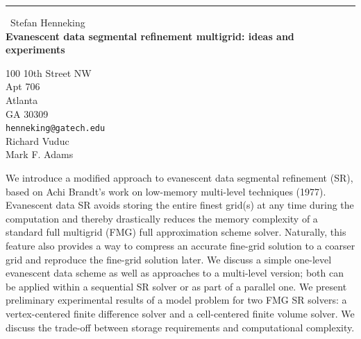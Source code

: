 \documentclass{report}
\begin{document}
\begin{center}
\rule{6in}{1pt} \
{\large Stefan Henneking \\
{\bf Evanescent data segmental refinement multigrid: ideas and experiments}}

100 10th Street NW \\ Apt 706 \\ Atlanta \\ GA 30309
\\
{\tt henneking@gatech.edu}\\
Richard Vuduc\\
Mark F. Adams\end{center}

We introduce a modified approach to evanescent data segmental refinement
(SR), based on Achi Brandt's work on low-memory multi-level techniques
(1977). Evanescent data SR avoids storing the entire finest grid(s) at
any time during the computation and thereby drastically reduces the
memory complexity of a standard full multigrid (FMG) full approximation
scheme solver. Naturally, this feature also provides a way to compress an
accurate fine-grid solution to a coarser grid and reproduce the fine-grid
solution later. We discuss a simple one-level evanescent data scheme as
well as approaches to a multi-level version; both can be applied within a
sequential SR solver or as part of a parallel one. We present preliminary
experimental results of a model problem for two FMG SR solvers: a
vertex-centered finite difference solver and a cell-centered finite
volume solver. We discuss the trade-off between storage requirements and
computational complexity.
\end{document}
